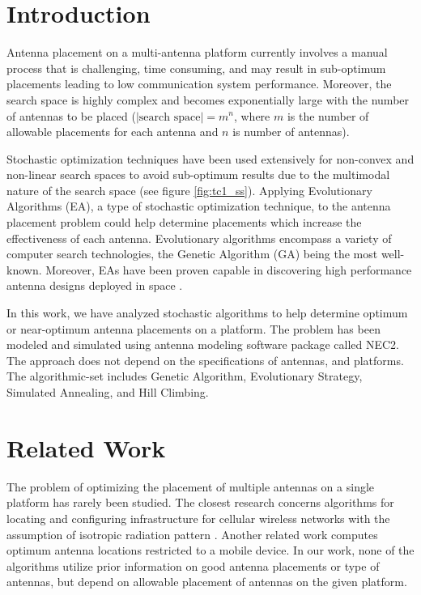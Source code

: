 \documentclass[conference]{IEEEtran}
\begin{document}
\section{Introduction}
Antenna placement on a multi-antenna platform currently involves a manual process that is challenging, time consuming, and may result in sub-optimum placements leading to low communication system performance. Moreover, the search space is highly complex and becomes exponentially large with the number of antennas to be placed ($|\text{search space}| = m^n$, where $m$ is the number of allowable placements for each antenna and $n$ is number of antennas). 

Stochastic optimization techniques have been used extensively for non-convex and non-linear search spaces to avoid sub-optimum results due to the multimodal nature of the search space (see figure \ref{fig:tc1_ss}). Applying Evolutionary Algorithms (EA), a type of stochastic optimization technique, to the antenna placement problem could help determine placements which increase the effectiveness of each antenna. Evolutionary algorithms encompass a variety of computer search technologies, the Genetic Algorithm (GA) being the most well-known. Moreover, EAs have been proven capable in discovering high performance antenna designs deployed in space \cite{lohn2005evolutionary}. 

In this work, we have analyzed stochastic algorithms to help determine optimum or near-optimum antenna placements on a platform. The problem has been modeled and simulated using antenna modeling software package called NEC2. The approach does not depend on the specifications of antennas, and platforms. The algorithmic-set includes Genetic Algorithm, Evolutionary Strategy, Simulated Annealing, and Hill Climbing.

\section{Related Work}
\label{sec:related}
The problem of optimizing the placement of multiple antennas on a single platform has rarely been studied.  The closest research concerns algorithms for locating and configuring infrastructure for cellular wireless networks with the assumption of isotropic radiation pattern \cite{rais2005}. Another related work computes optimum antenna locations restricted to a mobile device. In our work, none of the algorithms utilize prior information on good antenna placements or type of antennas, but depend on allowable placement of antennas on the given platform.
\end{document}
